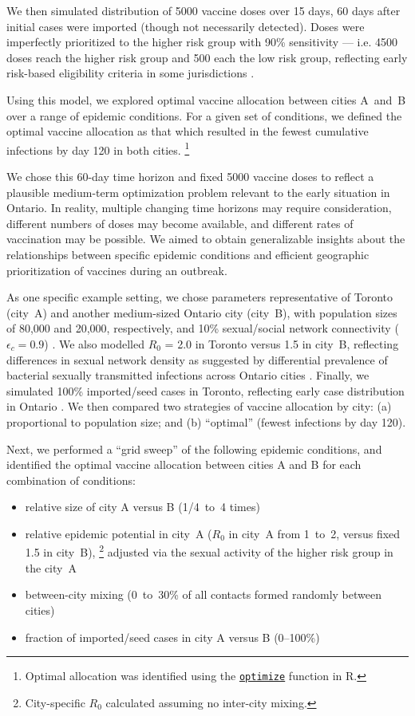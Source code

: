We then simulated distribution of 5000 vaccine doses over 15 days,
60 days after initial cases were imported (though not necessarily detected).
Doses were imperfectly prioritized to the higher risk group with 90\% sensitivity
--- i.e. 4500 doses reach the higher risk group and 500 each the low risk group,
reflecting early risk-based eligibility criteria in some jurisdictions \cite{TPH2022vax}.
\par
Using this model, we explored optimal vaccine allocation between cities A~and~B
over a range of epidemic conditions.
For a given set of conditions, we defined the optimal vaccine allocation as that which
resulted in the fewest cumulative infections by day 120 in both cities.%
\footnote{Optimal allocation was identified using the
  \href{https://www.rdocumentation.org/link/optimize?package=stats}
  {\texttt{optimize}} function in R.}
\par
We chose this 60-day time horizon and fixed 5000 vaccine doses to reflect
a plausible medium-term optimization problem relevant to the early \MPXV situation in Ontario.
In reality, multiple changing time horizons may require consideration,
different numbers of doses may become available, and
different rates of vaccination may be possible.
We aimed to obtain generalizable insights about the relationships between
specific epidemic conditions and efficient geographic prioritization of vaccines during an outbreak.
\par
As one specific example setting, we chose parameters representative of
Toronto (city~A) and another medium-sized Ontario city (city~B),
with \GBMSM population sizes of 80,000 and 20,000, respectively,
and 10\% sexual/social network connectivity ($\epsilon_c = 0.9$) \cite{Armstrong2020}.
We also modelled $R_0$ = 2.0 in Toronto versus 1.5 in city~B,
reflecting differences in sexual network density as suggested by differential prevalence of
bacterial sexually transmitted infections across Ontario cities \cite{Gesink2014,Hart2021}.
Finally, we simulated 100\% imported/seed cases in Toronto,
reflecting early \MPXV case distribution in Ontario \cite{PHO2022ont}.
We then compared two strategies of vaccine allocation by city:
(a) proportional to population size; and
(b) ``optimal'' (fewest infections by day 120).
\par
Next, we performed a ``grid sweep'' of the following epidemic conditions,
and identified the optimal vaccine allocation between cities A and B
for each combination of conditions:
\clearpage %
\begin{itemize}
  \item relative size of city A versus B (1/4~to~4 times)
  \item relative epidemic potential in city~A ($R_0$ in city~A from 1~to~2, versus fixed 1.5 in city~B),%
  \footnote{City-specific $R_0$ calculated assuming no inter-city mixing.}
        adjusted via the sexual activity of the higher risk group in the city~A
  \item between-city mixing (0~to~30\% of all contacts formed randomly between cities)
  \item fraction of imported/seed cases in city A versus B (0--100\%)
\end{itemize}



